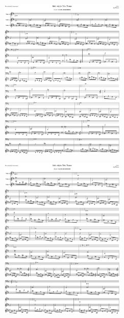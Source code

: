 \begin{figure}[H]                                             
{                                                             
  \setlength{\tabcolsep}{3.0pt}                               
  \setlength\cmidrulewidth{\heavyrulewidth} %
    \begin{subfigure}{0.5\textwidth}                            
  \includegraphics[width=6cm]{music/title_no_57_page_1001.png}%
    \end{subfigure}                                             
  \begin{subfigure}{0.5\textwidth}                            
  \includegraphics[width=6cm]{music/title_no_58_page_1001.png}%
    \end{subfigure}                                             
}                                                             
\end{figure}                                                  


